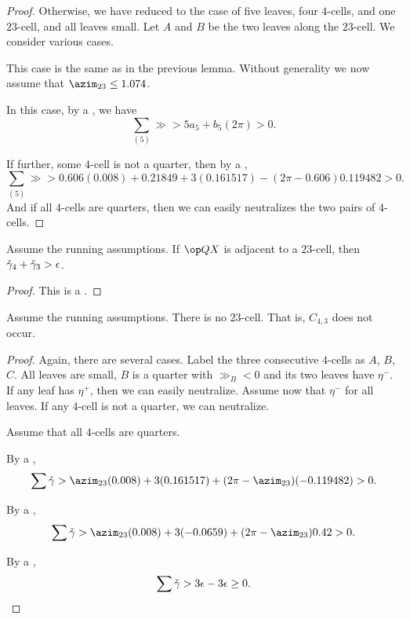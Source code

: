 \begin{proof}  Otherwise, we have reduced to the case of five leaves, four $4$-cells,
and one $23$-cell, and all leaves small.  Let $A$ and $B$ be the two leaves
along the $23$-cell.  We consider various cases.

  This case is the same as in the previous lemma.
Without generality we now assume that $\azim_{23}\le 1.074$.

  In this case,
by a , we have
\[
\sum_{(5)} \gg > 5 a_5 + b_5 (2\pi) > 0.
\]

  If further, some $4$-cell is not a quarter, then by a ,
\[
\sum_{(5)} \gg > 0.606 (0.008) + 0.21849 + 3 (0.161517) - (2\pi - 0.606) 0.119482 > 0.
\]
And if all $4$-cells are quarters, then we can easily neutralizes the two pairs of $4$-cells.
\end{proof}

\begin{lemma}
Assume the running assumptions.  If $\QX$ is adjacent to a $23$-cell, then
$\check\gamma_4 + \check\gamma_3 > \epsilon$.
\end{lemma}

\begin{proof} This is a .
\end{proof}

\begin{lemma}
Assume the running assumptions.  There is no $23$-cell.  That is, $C_{4,3}$ does not occur.
\end{lemma}

\begin{proof} Again, there are several cases.  Label the three consecutive $4$-cells
as $A$, $B$, $C$.  All leaves are small, $B$ is a quarter with $\gg_B<0$ and its two leaves have $\eta^-$.  If any leaf has $\eta^+$, then we can easily neutralize.  Assume now that $\eta^-$ for all leaves.  If any $4$-cell is not a quarter, we can neutralize.

Assume that all $4$-cells are quarters.  

  By a ,
\[
\sum\gg > \azim_{23} (0.008) + 3 (0.161517) + (2\pi - \azim_{23}) (-0.119482) > 0.
\]

  By a ,
\[
\sum\gg > \azim_{23} (0.008) + 3 (-0.0659) + (2\pi - \azim_{23}) 0.42 > 0.
\]

  By a ,
\[
\sum\check\gamma > 3\epsilon - 3\epsilon\ge 0.
\]
\end{proof}

